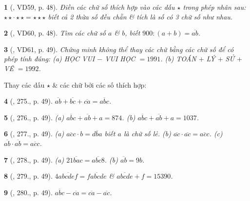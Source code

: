 \documentclass{article}
\newtheorem{baitoan}{}
\begin{document}
\begin{baitoan}[\cite{Binh_Toan_6_tap_1}, VD59, p. 48]
	Điền các chữ số thích hợp vào các dấu $\star$ trong phép nhân sau: $\star\star\cdot\star\star = \star\star\star$ biết cả 2 thừa số đều chẵn \& tích là số có 3 chữ số như nhau.
\end{baitoan}

\begin{baitoan}[\cite{Binh_Toan_6_tap_1}, VD60, p. 48]
	Tìm các chữ số $a$ \& $b$, biết $900:(a + b) = \overline{ab}$.
\end{baitoan}

\begin{baitoan}[\cite{Binh_Toan_6_tap_1}, VD61, p. 49]
	Chứng minh không thể thay các chữ bằng các chữ số để có phép tính đúng: (a) {\rm HỌC VUI $-$ VUI HỌC} $= 1991$. (b) {\rm TOÁN $+$ LÝ $+$ SỬ $+$ VẼ} $= 1992$.
\end{baitoan}
Thay các dấu $\star$ \& các chữ bởi các số thích hợp:

\begin{baitoan}[\cite{Binh_Toan_6_tap_1}, 275., p. 49]
	$\overline{ab} + \overline{bc} + \overline{ca} = \overline{abc}$.
\end{baitoan}

\begin{baitoan}[\cite{Binh_Toan_6_tap_1}, 276., p. 49]
	(a) $\overline{abc} + \overline{ab} + a = 874$. (b) $\overline{abc} + \overline{ab} + a = 1037$.
\end{baitoan}

\begin{baitoan}[\cite{Binh_Toan_6_tap_1}, 277., p. 49]
	(a) $\overline{acc}\cdot b = \overline{dba}$ biết $a$ là chữ số lẻ. (b) $\overline{ac}\cdot\overline{ac} = \overline{acc}$. (c) $\overline{ab}\cdot\overline{ab} = \overline{acc}$.
\end{baitoan}

\begin{baitoan}[\cite{Binh_Toan_6_tap_1}, 278., p. 49]
	(a) $2\overline{1bac} = \overline{abc8}$. (b) $\overline{ab} = 9b$.
\end{baitoan}

\begin{baitoan}[\cite{Binh_Toan_6_tap_1}, 279., p. 49]
	$4\overline{abcdef} = \overline{fabcde}$ \& $\overline{abcde} + f = 15390$.
\end{baitoan}

\begin{baitoan}[\cite{Binh_Toan_6_tap_1}, 280., p. 49]
	$\overline{abc} - \overline{ca} = \overline{ca} - \overline{ac}$.
\end{baitoan}
\end{document}
